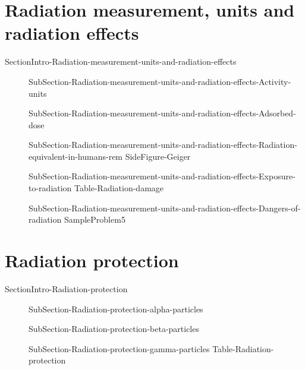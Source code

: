 \documentclass[main.tex]{subfiles}
\newcommand\chapterlabel{Ch-nuclear}\setcounter{figurenewcounter}{0}\setcounter{tablenewcounter}{0}\setcounter{formulanewcounter}{0}\chapterpicture{../{\chapterlabel}/figure1}\chapterpicturelabel{PxFuel}
\begin{document}
\section{Radiation measurement, units and radiation effects}{SectionIntro-Radiation-measurement-units-and-radiation-effects}
\sloppy \begin{description}
\item[] {SubSection-Radiation-measurement-units-and-radiation-effects-Activity-units}
\item[] {SubSection-Radiation-measurement-units-and-radiation-effects-Adsorbed-dose}
\item[] {SubSection-Radiation-measurement-units-and-radiation-effects-Radiation-equivalent-in-humans-rem}
{SideFigure-Geiger}
\item[] {SubSection-Radiation-measurement-units-and-radiation-effects-Exposure-to-radiation}
{Table-Radiation-damage}
\item[] {SubSection-Radiation-measurement-units-and-radiation-effects-Dangers-of-radiation}
{SampleProblem5}
\end{description}



\section{Radiation protection}{SectionIntro-Radiation-protection}
\sloppy \begin{description}
\item[] {SubSection-Radiation-protection-alpha-particles}
\item[] {SubSection-Radiation-protection-beta-particles}
\item[] {SubSection-Radiation-protection-gamma-particles}
{Table-Radiation-protection}
\end{description}
\end{document}
